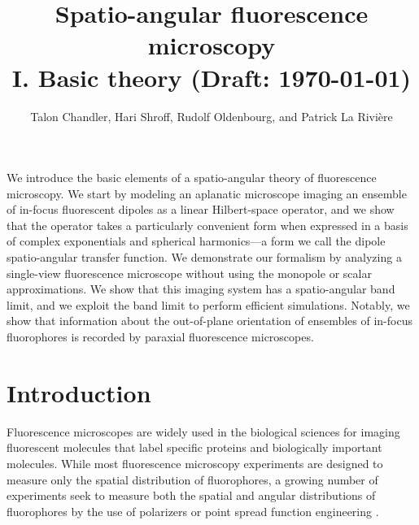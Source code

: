 \documentclass[]{osa-article}
\begin{document}
\title{Spatio-angular fluorescence microscopy\\ I. Basic theory (Draft: \today)}

\author{Talon Chandler, Hari Shroff, Rudolf Oldenbourg, and Patrick La Rivi\`ere}

\address{University of Chicago, Department of Radiology, Chicago, Illinois 60637, USA\\
  Section on High Resolution Optical Imaging, National Institute
  of Biomedical Imaging and Bioengineering, National Institutes of Health,
  Bethesda, Maryland 20892, USA\\
  Marine Biological Laboratory, Bell Center, Woods Hole, Massachusetts 02543, USA
}




\begin{abstract*}
  We introduce the basic elements of a spatio-angular theory of fluorescence
  microscopy. We start by modeling an aplanatic microscope imaging an ensemble
  of in-focus fluorescent dipoles as a linear Hilbert-space operator, and we
  show that the operator takes a particularly convenient form when expressed in
  a basis of complex exponentials and spherical harmonics---a form we call the
  dipole spatio-angular transfer function. We demonstrate our formalism by
  analyzing a single-view fluorescence microscope without using the monopole or
  scalar approximations. We show that this imaging system has a spatio-angular
  band limit, and we exploit the band limit to perform efficient simulations.
  Notably, we show that information about the out-of-plane orientation of
  ensembles of in-focus fluorophores is recorded by paraxial fluorescence
  microscopes.
\end{abstract*}

\section{Introduction}
Fluorescence microscopes are widely used in the biological sciences for imaging
fluorescent molecules that label specific proteins and biologically important
molecules. While most fluorescence microscopy experiments are designed to
measure only the spatial distribution of fluorophores, a growing number of
experiments seek to measure both the spatial and angular distributions of
fluorophores by the use of polarizers \cite{vrabioiu2006, mattheyses2010,
  mehta2016, mcquilken2017, zhanghao2017} or point spread function engineering
\cite{agrawal2012, zhang2018}.
\end{document}
